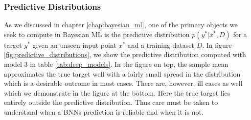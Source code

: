 \subsubsection{Predictive Distributions}
As we discussed in chapter \ref{chap:bayesian_ml}, one of the primary objects we seek to compute
in Bayesian ML is the predictive distribution $p(y^*|x^*, D)$ for a target $y^*$ given an unseen input point $x^*$ and
a training dataset $D$. In figure \ref{fig:predictive_distributions}, we show the predictive distribution computed with model 3 in table \ref{tab:deep_models}. In the figure on top, the sample mean approximates the true target well with a fairly small spread in the distribution which is a desirable outcome in most cases. There are, however, ill cases as well which we demonstrate in the figure at the bottom. Here the true target lies entirely outside the predictive distribution. Thus care must be taken to understand when a BNNs prediction is reliable and when it is not.
